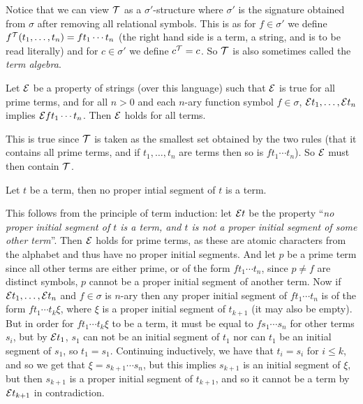 Notice that we can view ${\cal T}$ as a $\sigma'$-structure where $\sigma'$ is the signature obtained from $\sigma$ after removing all relational symbols.
This is as for $f\in\sigma'$ we define $f^{\cal T}(t_1,\dots,t_n)=ft_1\cdots t_n$ (the right hand side is a term, a string, and is to be read literally) and for $c\in\sigma'$ we define $c^{\cal T}=c$.
So ${\cal T}$ is also sometimes called the {\it term algebra}.

\bprop[title=Principle of Term Induction, name=terminductprinciple]

    Let ${\cal E}$ be a property of strings (over this language) such that ${\cal E}$ is true for all prime terms, and for all $n>0$ and each $n$-ary function symbol $f\in\sigma$,
    ${\cal E}t_1,\dots,{\cal E}t_n$ implies ${\cal E}ft_1\cdots t_n$.
    Then ${\cal E}$ holds for all terms.

\eprop

This is true since ${\cal T}$ is taken as the smallest set obtained by the two rules (that it contains all prime terms, and if $t_1,\dots,t_n$ are terms then so is $ft_1\cdots t_n$).
So ${\cal E}$ must then contain ${\cal T}$.

\blemm

    Let $t$ be a term, then no proper intial segment of $t$ is a term.

\elemm

This follows from the principle of term induction: let ${\cal E}t$ be the property ``{\it no proper initial segment of $t$ is a term, and $t$ is not a proper initial segment of some other term}''.
Then ${\cal E}$ holds for prime terms, as these are atomic characters from the alphabet and thus have no proper initial segments.
And let $p$ be a prime term since all other terms are either prime, or of the form $ft_1\cdots t_n$, since $p\neq f$ are distinct symbols, $p$ cannot be a proper initial segment of another term.
Now if ${\cal E}t_1,\dots,{\cal E}t_n$ and $f\in\sigma$ is $n$-ary then any proper initial segment of $ft_1\cdots t_n$ is of the form $ft_1\cdots t_k\xi$, where $\xi$ is a proper initial segment of
$t_{k+1}$ (it may also be empty).
But in order for $ft_1\cdots t_k\xi$ to be a term, it must be equal to $fs_1\cdots s_n$ for other terms $s_i$, but by ${\cal E}t_1$, $s_1$ can not be an initial segment of $t_1$ nor can $t_1$ be an initial
segment of $s_1$, so $t_1=s_1$.
Continuing inductively, we have that $t_i=s_i$ for $i\leq k$, and so we get that $\xi=s_{k+1}\cdots s_n$, but this implies $s_{k+1}$ is an initial segment of $\xi$, but then $s_{k+1}$ is a proper initial
segment of $t_{k+1}$, and so it cannot be a term by ${\cal E}t_{k+1}$ in contradiction.

